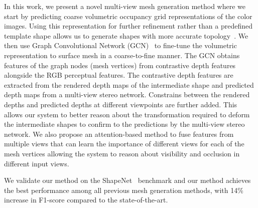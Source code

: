 
In this work, we present a novel multi-view mesh generation method where we start by predicting coarse volumetric occupancy grid representations of the color images.
Using this representation for further refinement rather than a predefined template shape allows us to generate shapes with more accurate topology~\cite{gkioxari2019meshrcnn}.
We then use Graph Convolutional Network (GCN)~\cite{scarselli2008graph,wang2018pixel2mesh} to fine-tune the volumetric representation to surface mesh in a coarse-to-fine manner.
The GCN obtains features of the graph nodes (mesh vertices) from contrastive depth features alongside the RGB perceptual features.
The contrastive depth features are extracted from the rendered depth maps of the intermediate shape and predicted depth maps from a multi-view stereo network.
Constrains between the rendered depths and predicted depths at different viewpoints are further added.
This allows our system to better reason about the transformation required to deform the intermediate shapes to confirm to the predictions by the multi-view stereo network.
We also propose an attention-based method to fuse features from multiple views that can learn the importance of different views for each of the mesh vertices allowing the system to reason about visibility and occlusion in different input views.

We validate our method on the ShapeNet~\cite{chang2015shapenet} benchmark and our method achieves the best performance among all previous mesh generation methods, with 14\% increase in F1-score compared to the state-of-the-art.


